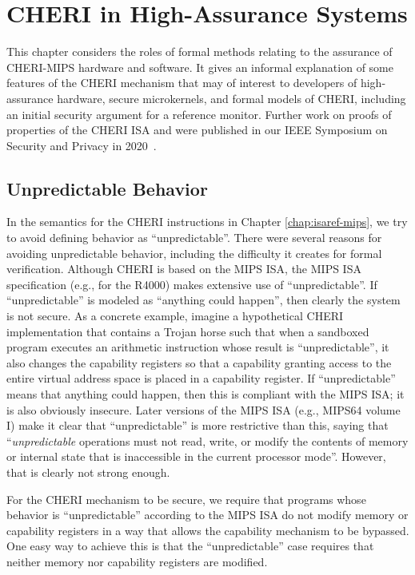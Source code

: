 \chapter{CHERI in High-Assurance Systems}
\label{chap:assurance}

This chapter considers the roles of formal methods relating to the assurance
of CHERI-MIPS hardware and software.  It gives an informal explanation of some
features of the CHERI mechanism that may of interest to developers of
high-assurance hardware, secure microkernels, and formal models of CHERI,
including an initial security argument for a reference monitor.  Further
work on proofs of properties of the CHERI ISA and were published in our
IEEE Symposium on Security and Privacy in 2020~\cite{cheri-formal-SP2020}.

\section{Unpredictable Behavior}

In the semantics for the CHERI instructions in Chapter \ref{chap:isaref-mips},
we try 
to avoid defining behavior as ``unpredictable''. There were several reasons 
for avoiding unpredictable behavior, including the difficulty it creates for
formal verification.
Although CHERI is based on the MIPS ISA, 
the MIPS ISA specification (e.g., for the
R4000) makes extensive use of ``unpredictable''. If ``unpredictable'' is
modeled as ``anything could happen'', then clearly the system is not secure.
As a 
concrete example, imagine a hypothetical CHERI implementation that contains
a Trojan horse such that when a sandboxed program executes an arithmetic
instruction whose result is ``unpredictable'', it also changes the capability
registers so that a capability granting access to the entire virtual address
space is placed in a capability register. If ``unpredictable'' means that
anything could happen, then this is compliant with the MIPS ISA; it is also 
obviously insecure. Later versions of the MIPS ISA (e.g., MIPS64 volume I) make
it clear that ``unpredictable'' is more restrictive than this, saying that
``\emph{unpredictable} operations must not read, write, or modify the contents of
memory or internal state that is inaccessible in the current processor mode''.
However, that is clearly not strong enough.

For the CHERI mechanism to be secure, we require that programs whose behavior
is ``unpredictable'' according to the MIPS ISA do not modify memory or
capability registers in a way that allows the capability mechanism to be bypassed.
One easy way to achieve this is that the ``unpredictable'' case requires that
neither memory nor capability registers are modified.

